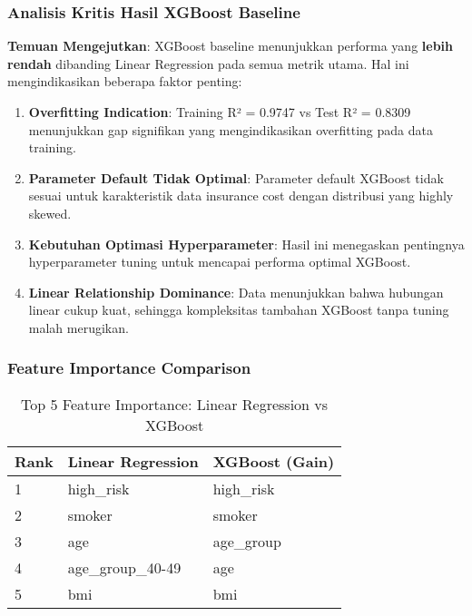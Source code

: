 \subsubsection{Analisis Kritis Hasil XGBoost Baseline}

\textbf{Temuan Mengejutkan}: XGBoost baseline menunjukkan performa yang \textbf{lebih rendah} dibanding Linear Regression pada semua metrik utama. Hal ini mengindikasikan beberapa faktor penting:

\begin{enumerate}
    \item \textbf{Overfitting Indication}: Training R² = 0.9747 vs Test R² = 0.8309 menunjukkan gap signifikan yang mengindikasikan overfitting pada data training.

    \item \textbf{Parameter Default Tidak Optimal}: Parameter default XGBoost tidak sesuai untuk karakteristik data insurance cost dengan distribusi yang highly skewed.

    \item \textbf{Kebutuhan Optimasi Hyperparameter}: Hasil ini menegaskan pentingnya hyperparameter tuning untuk mencapai performa optimal XGBoost.

    \item \textbf{Linear Relationship Dominance}: Data menunjukkan bahwa hubungan linear cukup kuat, sehingga kompleksitas tambahan XGBoost tanpa tuning malah merugikan.
\end{enumerate}

\subsubsection{Feature Importance Comparison}
\begin{table}[H]
\centering
\caption{Top 5 Feature Importance: Linear Regression vs XGBoost}
\label{tab:feature-importance-comparison}
\begin{tabular}{|l|l|l|}
\hline
\textbf{Rank} & \textbf{Linear Regression} & \textbf{XGBoost (Gain)} \\
\hline
1 & high\_risk & high\_risk \\
2 & smoker & smoker \\
3 & age & age\_group \\
4 & age\_group\_40-49 & age \\
5 & bmi & bmi \\
\hline
\end{tabular}
\end{table}

